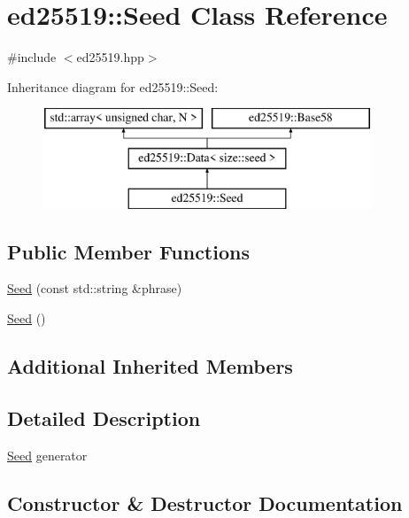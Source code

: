 \hypertarget{classed25519_1_1_seed}{}\section{ed25519\+:\+:Seed Class Reference}
\label{classed25519_1_1_seed}


{\ttfamily \#include $<$ed25519.\+hpp$>$}

Inheritance diagram for ed25519\+:\+:Seed\+:\begin{figure}[H]
\begin{center}
\leavevmode
\includegraphics[height=3.000000cm]{classed25519_1_1_seed}
\end{center}
\end{figure}
\subsection*{Public Member Functions}
\begin{DoxyCompactItemize}
\item 
\mbox{\hyperlink{classed25519_1_1_seed_ad1e098bfd87b7bcbb74fe5aefd03200a}{Seed}} (const std\+::string \&phrase)
\item 
\mbox{\hyperlink{classed25519_1_1_seed_ade6584a80efeb3ad8b89929a9684b30f}{Seed}} ()
\end{DoxyCompactItemize}
\subsection*{Additional Inherited Members}


\subsection{Detailed Description}
\mbox{\hyperlink{classed25519_1_1_seed}{Seed}} generator 

\subsection{Constructor \& Destructor Documentation}
\mbox{\label{classed25519_1_1_seed_ad1e098bfd87b7bcbb74fe5aefd03200a}} 
